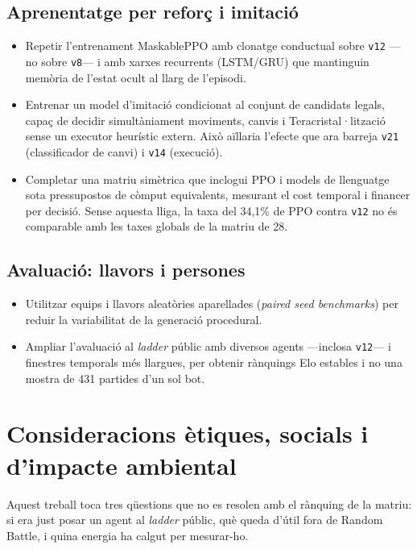 \subsection{Aprenentatge per reforç i imitació}

\begin{itemize}
    \item Repetir l'entrenament MaskablePPO amb clonatge conductual sobre \texttt{v12} ---no sobre \texttt{v8}--- i amb xarxes recurrents (LSTM/GRU) que mantinguin memòria de l'estat ocult al llarg de l'episodi.
    \item Entrenar un model d'imitació condicionat al conjunt de candidats legals, capaç de decidir simultàniament moviments, canvis i Teracristal·lització sense un executor heurístic extern. Això aïllaria l'efecte que ara barreja \texttt{v21} (classificador de canvi) i \texttt{v14} (execució).
    \item Completar una matriu simètrica que inclogui PPO i models de llenguatge sota pressupostos de còmput equivalents, mesurant el cost temporal i financer per decisió. Sense aquesta lliga, la taxa del 34,1\% de PPO contra \texttt{v12} no és comparable amb les taxes globals de la matriu de 28.
\end{itemize}

\subsection{Avaluació: llavors i persones}

\begin{itemize}
    \item Utilitzar equips i llavors aleatòries aparellades (\emph{paired seed benchmarks}) per reduir la variabilitat de la generació procedural.
    \item Ampliar l'avaluació al \emph{ladder} públic amb diversos agents ---inclosa \texttt{v12}--- i finestres temporals més llargues, per obtenir rànquings Elo estables i no una mostra de 431 partides d'un sol bot.
\end{itemize}

\section{Consideracions ètiques, socials i d'impacte ambiental}
\label{sec:etica_impacte}

Aquest treball toca tres qüestions que no es resolen amb el rànquing de la matriu: si era just posar un agent al \emph{ladder} públic, què queda d'útil fora de Random Battle, i quina energia ha calgut per mesurar-ho.

